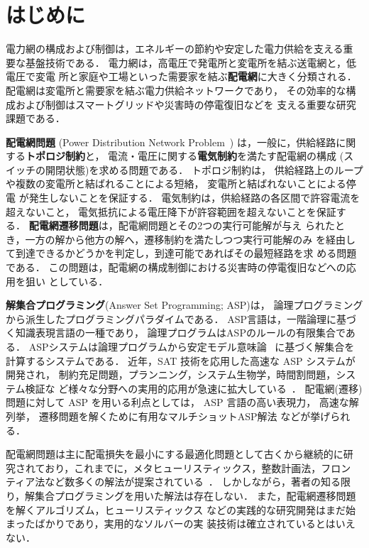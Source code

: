 \chapter{はじめに}\label{chap:intro}

電力網の構成および制御は，エネルギーの節約や安定した電力供給を支える重
要な基盤技術である．
電力網は，高電圧で発電所と変電所を結ぶ送電網と，低電圧で変電
所と家庭や工場といった需要家を結ぶ\textbf{配電網}に大きく分類される．
配電網は変電所と需要家を結ぶ電力供給ネットワークであり，
その効率的な構成および制御はスマートグリッドや災害時の停電復旧などを
支える重要な研究課題である．

\textbf{配電網問題}
(Power Distribution Network Problem~\cite{Minato:dnet:ZDD,DBLP:journals/tsg/InoueTWKYKTMH14})
は，一般に，供給経路に関する\textbf{トポロジ制約}と，
電流・電圧に関する\textbf{電気制約}を満たす配電網の構成
(スイッチの開閉状態)を求める問題である．
トポロジ制約は，
供給経路上のループや複数の変電所と結ばれることによる短絡，
変電所と結ばれないことによる停電
が発生しないことを保証する．
電気制約は，供給経路の各区間で許容電流を超えないこと，
電気抵抗による電圧降下が許容範囲を超えないことを保証する．
%
\textbf{配電網遷移問題}は，配電網問題とその2つの実行可能解が与え
られたとき，一方の解から他方の解へ，遷移制約を満たしつつ実行可能解のみ
を経由して到達できるかどうかを判定し，到達可能であればその最短経路を求
める問題である．
この問題は，配電網の構成制御における災害時の停電復旧などへの応用を狙い
としている．

\textbf{解集合プログラミング}(Answer Set Programming; ASP\cite{%
  Baral03:cambridge,%
  Gelfond88:iclp,%
  Inoue08:jssst,%
  Niemela99:amai})は，
論理プログラミングから派生したプログラミングパラダイムである．
ASP言語は，一階論理に基づく知識表現言語の一種であり，
論理プログラムはASPのルールの有限集合である．
ASPシステムは論理プログラムから安定モデル意味論~\cite{Gelfond88:iclp}
に基づく解集合を計算するシステムである．
近年，SAT 技術を応用した高速な ASP システムが開発され，
制約充足問題，プランニング，システム生物学，時間割問題，システム検証な
ど様々な分野への実用的応用が急速に拡大している~\cite{%
  DBLP:journals/anor/BanbaraIKOSSTW19,%
  DBLP:journals/tplp/BanbaraKOS17,%
  ASPAISAT}．
配電網(遷移)問題に対して ASP を用いる利点としては，
ASP 言語の高い表現力，
高速な解列挙，
遷移問題を解くために有用なマルチショットASP解法
などが挙げられる．

配電網問題は主に配電損失を最小にする最適化問題として古くから継続的に研
究されており，これまでに，メタヒューリスティックス，整数計画法，フロン
ティア法など数多くの解法が提案されている~\cite{%
  ChiJum90,
  Hayashi:dnet:model,
  Minato:dnet:ZDD,
  DBLP:journals/tsg/InoueTWKYKTMH14}．
しかしながら，著者の知る限り，解集合プログラミングを用いた解法は存在しない．
また，配電網遷移問題を解くアルゴリズム，ヒューリスティックス
などの実践的な研究開発はまだ始まったばかりであり，実用的なソルバーの実
装技術は確立されているとはいえない．

